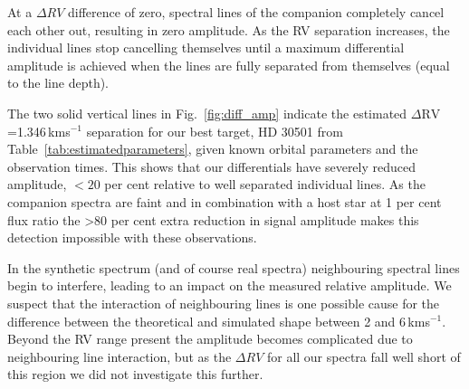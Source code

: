 \documentclass[fleqn,usenatbib]{mnras}
\newcommand{\kmps}{\,kms\(^{-1}\)}	%
\begin{document}
    At a \(\Delta RV\) difference of zero, spectral lines of the companion completely cancel each other out, resulting in zero amplitude. As the RV separation increases, the individual lines stop cancelling themselves until a maximum differential amplitude is achieved when the lines are fully separated from themselves (equal to the line depth).

    The two solid vertical lines in Fig.~\ref{fig:diff_amp} indicate the estimated \(\Delta \textrm{RV}\)=1.346\kmps{} separation for our best target, {HD 30501} from Table~\ref{tab:estimatedparameters}, given known orbital parameters and the observation times. This shows that our differentials have severely reduced amplitude, \(<20\) per cent relative to well separated individual lines. As the companion spectra are faint and in combination with a host star at 1 per cent flux ratio the >80 per cent extra reduction in signal amplitude makes this detection impossible with these observations.

    In the synthetic spectrum (and of course real spectra) neighbouring spectral lines begin to interfere, leading to an impact on the measured relative amplitude. We suspect that the interaction of neighbouring lines is one possible cause for the difference between the theoretical and simulated shape between 2 and 6\kmps{}. Beyond the RV range present the amplitude becomes complicated due to neighbouring line interaction, but as the \(\Delta RV\) for all our spectra fall well short of this region we did not investigate this further.
\end{document}
